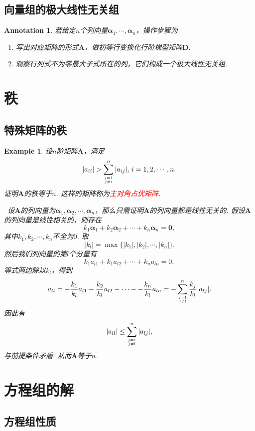 \documentclass{article}
\newtheorem{example}[theorem]{Example}
\newtheorem{annotation}[theorem]{Annotation}
\newcommand{\hints}{{\color{blue} \text{hints}}}
\newcommand{\mbf}[1]{\bm{#1}}
\newcommand{\redt}[1]{\textcolor{red}{#1}}
\begin{document}
\subsection{向量组的极大线性无关组}

\begin{annotation}
\rm 若给定$n$个列向量$\mbf{\alpha}_1,\cdots,\mbf{\alpha}_n$，操作步骤为
\begin{enumerate}
	\item 写出对应矩阵的形式$\mbf{A}$，做初等行变换化行阶梯型矩阵$\mbf{D}$.
	\item 观察行列式不为零最大子式所在的列，它们构成一个极大线性无关组. 
\end{enumerate}
\end{annotation}


\newpage
\section{秩}

\subsection{特殊矩阵的秩}

\begin{example}
\rm 设$n$阶矩阵$\mbf{A}$，满足
$$
|a_{ii}| >  \sum\limits_{j = 1 \atop j \neq i}^{n} |a_{ij}|, \, i = 1,2,\cdots,n.
$$
证明$\mbf{A}$的秩等于$n$. 这样的矩阵称为\redt{主对角占优矩阵}. 

\hints\  设$\mbf{A}$的列向量为$\mbf{\alpha}_1,\mbf{\alpha}_2,\cdots,\mbf{\alpha}_n$，那么只需证明$\mbf{A}$的列向量都是线性无关的. 假设$\mbf{A}$的列向量是线性相关的，则存在
$$
k_1\mbf{\alpha}_1 + k_2\mbf{\alpha}_2 + \cdots + k_n\mbf{\alpha}_n = \mbf{0},
$$
其中$k_1,k_2,\cdots,k_n$不全为$0$. 取
$$
|k_l| = \max\{|k_1|,|k_2|,\cdots,|k_n|\}. 
$$
然后我们列向量的第$l$个分量有
$$
k_1a_{l1} + k_1a_{l2} + \cdots + k_na_{ln} = 0,
$$
等式两边除以$k_l$，得到
$$
a_{ll} = - \frac{k_1}{k_l}a_{l1} - \frac{k_2}{k_l}a_{l2} - \cdots - - \frac{k_n}{k_l}a_{ln} =  -\sum\limits_{j = 1 \atop j \neq l}^{n} \frac{k_j}{k_l}|a_{lj}|.
$$
因此有
$$
|a_{ll}| \leq \sum\limits_{j = 1 \atop j \neq l}^{n} |a_{lj}|,
$$
与前提条件矛盾. 从而$\mbf{A}$等于$n$. 
\end{example}

\newpage
\section{方程组的解}

\subsection{方程组性质}
\end{document}
